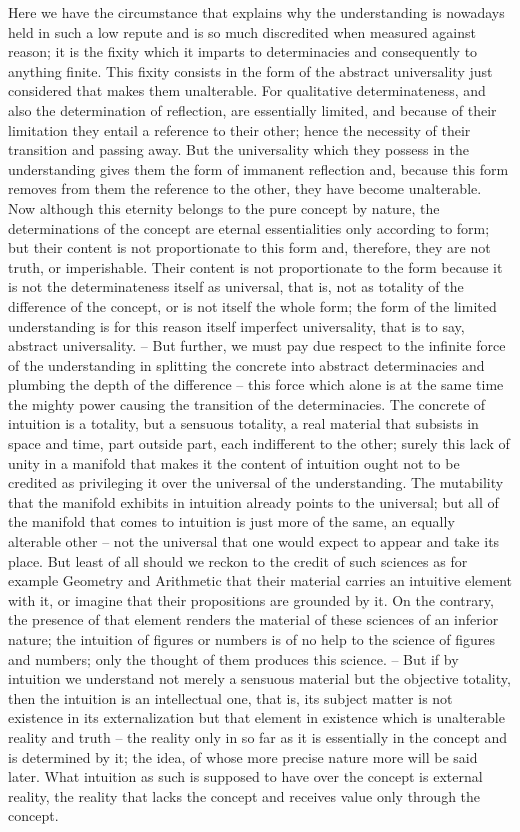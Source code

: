 Here we have the circumstance that explains why the understanding
is nowadays held in such a low repute and is so much discredited when
measured against reason;
it is the fixity which it imparts to determinacies
and consequently to anything finite.
This fixity consists in the form of
the abstract universality just considered that makes them unalterable. For
qualitative determinateness, and also the determination of reflection, are
essentially limited, and because of their limitation they entail a reference
to their other; hence the necessity of their transition and passing away. But
the universality which they possess in the understanding gives them the
form of immanent reflection and, because this form removes from them
the reference to the other, they have become unalterable. Now although
this eternity belongs to the pure concept by nature, the determinations
of the concept are eternal essentialities only according to form; but their
content is not proportionate to this form and, therefore, they are not truth,
or imperishable. Their content is not proportionate to the form because it
is not the determinateness itself as universal, that is, not as totality of the
difference of the concept, or is not itself the whole form; the form of the
limited understanding is for this reason itself imperfect universality, that is
to say, abstract universality. – But further, we must pay due respect to the
infinite force of the understanding in splitting the concrete into abstract
determinacies and plumbing the depth of the difference – this force which
alone is at the same time the mighty power causing the transition of
the determinacies. The concrete of intuition is a totality, but a sensuous
totality, a real material that subsists in space and time, part outside part,
each indifferent to the other; surely this lack of unity in a manifold that
makes it the content of intuition ought not to be credited as privileging it
over the universal of the understanding. The mutability that the manifold
exhibits in intuition already points to the universal; but all of the manifold
that comes to intuition is just more of the same, an equally alterable other –
not the universal that one would expect to appear and take its place. But
least of all should we reckon to the credit of such sciences as for example
Geometry and Arithmetic that their material carries an intuitive element
with it, or imagine that their propositions are grounded by it. On the
contrary, the presence of that element renders the material of these sciences
of an inferior nature; the intuition of figures or numbers is of no help to
the science of figures and numbers; only the thought of them produces this
science. – But if by intuition we understand not merely a sensuous material
but the objective totality, then the intuition is an intellectual one, that is,
its subject matter is not existence in its externalization but that element
in existence which is unalterable reality and truth – the reality only in so
far as it is essentially in the concept and is determined by it; the idea, of
whose more precise nature more will be said later. What intuition as such
is supposed to have over the concept is external reality, the reality that lacks
the concept and receives value only through the concept.

